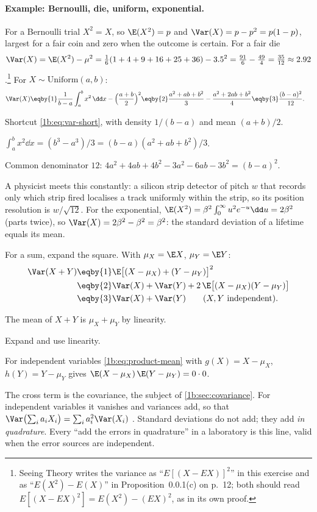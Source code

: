 \paragraph{Example: Bernoulli, die, uniform, exponential.}
For a Bernoulli trial $X^2=X$, so $\E(X^2)=p$ and
$\Var(X)=p-p^2=p(1-p)$, largest for a fair coin and zero when the outcome is
certain. For a fair die
\[
  \Var(X)=\E(X^2)-\mu^2=\tfrac16(1+4+9+16+25+36)-3.5^2
  =\tfrac{91}{6}-\tfrac{49}{4}=\tfrac{35}{12}\approx2.92
\]
.\footnote{Seeing Theory writes the variance as
``$E[(X-EX)]^2$'' in this exercise and as ``$E(X^2)-E(X)$'' in Proposition~0.0.1(c)
on p.~12; both should read $E[(X-EX)^2]=E(X^2)-(EX)^2$, as in its own proof.}
For $X\sim\mathrm{Uniform}(a,b)$:
\begin{align*}
  \Var(X)
  &\eqby{1} \frac{1}{b-a}\int_a^bx^2\,\dd x-\Bigl(\frac{a+b}{2}\Bigr)^2
   \eqby{2} \frac{a^2+ab+b^2}{3}-\frac{a^2+2ab+b^2}{4}
   \eqby{3} \frac{(b-a)^2}{12} .
\end{align*}
\begin{explain}
  \item Shortcut \eqref{1b:eq:var-short}, with density $1/(b-a)$ and mean
        $(a+b)/2$.
  \item $\int_a^bx^2\dd x=(b^3-a^3)/3=(b-a)(a^2+ab+b^2)/3$.
  \item Common denominator $12$: $4a^2+4ab+4b^2-3a^2-6ab-3b^2=(b-a)^2$.
\end{explain}
A physicist meets this constantly: a silicon strip detector of pitch $w$ that
records only which strip fired localises a track uniformly within the strip,
so its position resolution is $w/\sqrt{12}$. For the exponential,
$\E(X^2)=\beta^2\int_0^\infty u^2e^{-u}\dd u=2\beta^2$ (parts twice), so
$\Var(X)=2\beta^2-\beta^2=\beta^2$: the standard deviation of a lifetime equals
its mean.

For a sum, expand the square. With $\mu_X=\E X$, $\mu_Y=\E Y$:
\begin{align}
  \Var(X+Y)
  &\eqby{1} \E\bigl[(X-\mu_X)+(Y-\mu_Y)\bigr]^2 \nonumber\\
  &\eqby{2} \Var(X)+\Var(Y)+2\,\E\bigl[(X-\mu_X)(Y-\mu_Y)\bigr] \nonumber\\
  &\eqby{3} \Var(X)+\Var(Y)\qquad(X,Y\text{ independent}).
  \label{1b:eq:var-sum}
\end{align}
\begin{explain}
  \item The mean of $X+Y$ is $\mu_X+\mu_Y$ by linearity.
  \item Expand and use linearity.
  \item For independent variables \eqref{1b:eq:product-mean} with $g(X)=X-\mu_X$,
        $h(Y)=Y-\mu_Y$ gives $\E(X-\mu_X)\,\E(Y-\mu_Y)=0\cdot0$.
\end{explain}
The cross term is the covariance, the subject of \cref{1b:sec:covariance}. For
independent variables it vanishes and variances add, so that
$\Var\bigl(\sum_ia_iX_i\bigr)=\sum_ia_i^2\Var(X_i)$ .
Standard deviations do not add; they add \emph{in quadrature}. Every
``add the errors in quadrature'' in a laboratory is this line, valid when the
error sources are independent.

